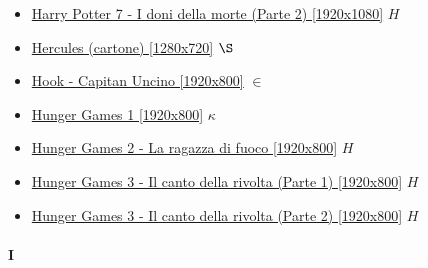\begin{itemize}
			\item \href{https://mega.nz/#!P9ZFBDAI!u7VF-GGOXyPQM4UuD8sySL4FKHHt_nssRVNgDZNsAd0} {Harry Potter 7 - I doni della morte (Parte 2) [1920x1080]}  $H$ \\
			\item \href{https://mega.nz/#!yKoCDAIQ!s6v18woap-w0ba2D_G_lvqmi8vRd5CiCKGiLI9GVfLk} {Hercules (cartone) [1280x720]}  $\S$ \\  
			\item \href{https://mega.nz/#!qXBnAL6Z!brwEctLk5XfnG63hQ1dJ2rz-MI0PuXdWd0vl7g1SVO4} {Hook - Capitan Uncino [1920x800]}  $\in$ \\ 
			\item \href{https://mega.nz/#!HcJF1Bqa!U3aMlwoyX13F4LZzu0i2uneOJ1ehAyeqv0YJuKkqsHY} {Hunger Games 1 [1920x800]}  $\kappa$ \\ 
			\item \href{https://mega.nz/#!W0pGBIjJ!Lngn8WWkSkvbP5vETbRswHWd2pteTq4jZ2CzgzQtLOo} {Hunger Games 2 - La ragazza di fuoco [1920x800]}  $H$ \\ 
			\item \href{https://mega.nz/#!r5ADUQTB!yYk6lB9_0p-c8PCA6njmbHmm2Y2NXFzK-IL_XUqccRg} {Hunger Games 3 - Il canto della rivolta (Parte 1) [1920x800]}  $H$ \\ 
			\item \href{https://mega.nz/#!D5gFAChB!FrvK8Nk6wpENawoejgk2JzZFVH06mT5svaAdmooALjw} {Hunger Games 3 - Il canto della rivolta (Parte 2) [1920x800]}  $H$ \\ 
		
		\end{itemize}
	
	\paragraph{I} \hypertarget{FII}{}
	

